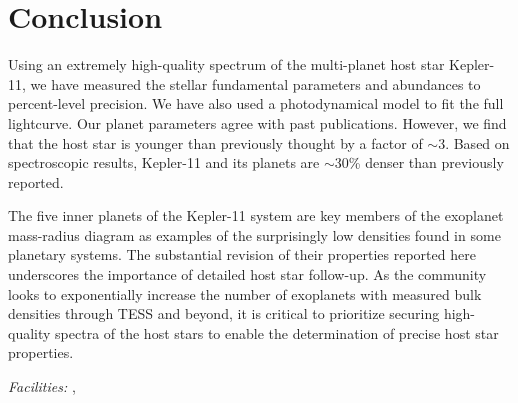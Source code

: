 \documentclass[oneside]{emulateapj}
\begin{document}
\section{Conclusion}

Using an extremely high-quality spectrum of the multi-planet host star Kepler-11, we have measured the stellar fundamental parameters and abundances to percent-level precision. We have also used a photodynamical model to fit the full \Kepler lightcurve. Our planet parameters agree with past publications. However, we find that the host star is younger than previously thought by a factor of $\sim$3. Based on spectroscopic results, Kepler-11 and its planets are $\sim$30\% denser than previously reported.

The five inner planets of the Kepler-11 system are key members of the exoplanet mass-radius diagram as examples of the surprisingly low densities found in some planetary systems. The substantial revision of their properties reported here underscores the importance of detailed host star follow-up. As the community looks to exponentially increase the number of exoplanets with measured bulk densities through TESS and beyond, it is critical to prioritize securing high-quality spectra of the host stars to enable the determination of precise host star properties.

\bigskip
{}

{\it Facilities:} , 




\end{document}
